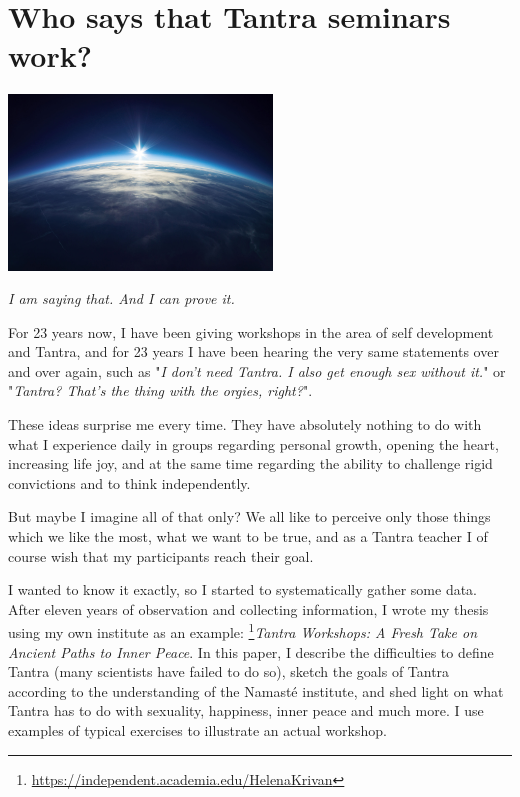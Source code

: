 \section{Who says that Tantra seminars work?}

\begin{center}
\includegraphics[width=7cm]{images/22_works.png}
\end{center}

\textit{I am saying that. And I can prove it.}

For 23 years now, I have been giving workshops in the area of self development and Tantra, and for 23 years I have been hearing the very same statements over and over again, such as "\textit{I don't need Tantra. I also get enough sex without it.}" or "\textit{Tantra? That's the thing with the orgies, right?}".

These ideas surprise me every time. They have absolutely nothing to do with what I experience daily in groups regarding personal growth, opening the heart, increasing life joy, and at the same time regarding the ability to challenge rigid convictions and to think independently.

But maybe I imagine all of that only? We all like to perceive only those things which we like the most, what we want to be true, and as a Tantra teacher I of course wish that my participants reach their goal.

I wanted to know it exactly, so I started to systematically gather some data. After eleven years of observation and collecting information, I wrote my thesis using my own institute as an example: \footnote{\url{https://independent.academia.edu/HelenaKrivan}}{\textit{Tantra Workshops: A Fresh Take on Ancient Paths to Inner Peace}}. In this paper, I describe the difficulties to define Tantra (many scientists have failed to do so), sketch the goals of Tantra according to the understanding of the Namasté institute, and shed light on what Tantra has to do with sexuality, happiness, inner peace and much more. I use examples of typical exercises to illustrate an actual workshop.

